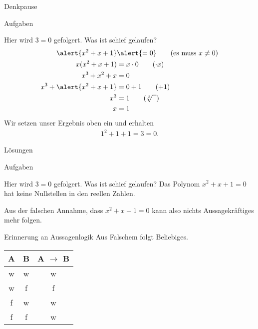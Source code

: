{
	\begin{frame}[fragile]{Denkpause}
		\begin{alertblock}{Aufgaben}
		\small{
			\begin{block}{Hier wird $3=0$ gefolgert. Was ist schief gelaufen?}
				\begin{align*}
					\alert{x^2 + x + 1} &\alert{= 0} \tag{es muss $x\neq0$}\\
					x(x^2 + x + 1) &= x \cdot 0 \tag{$\cdot x$}\\
					x^3 + x^2 + x &= 0\\
					x^3 + \alert{x^2 + x + 1} &= 0 + 1\tag{$+ 1$}\\
					x^3 &= 1\tag{$\sqrt[3]{\phantom{x}}$}\\
					x &= 1
				\end{align*}
				Wir setzen unser Ergebnis oben ein und erhalten
				\begin{align*}
					1^2 + 1 + 1= 3 = 0\text{.}
				\end{align*}
			\end{block}
		}
		\end{alertblock}
	\end{frame}
}

{
	\begin{frame}[fragile]{Lösungen}
		\begin{alertblock}{Aufgaben}
		\small{
			\begin{block}{Hier wird $3=0$ gefolgert. Was ist schief gelaufen?}
				Das Polynom $x^2 + x + 1 = 0$ hat keine Nullstellen in den reellen Zahlen.
				
				Aus der falschen Annahme, dass $x^2 + x + 1 = 0$ kann also nichts Aussagekräftiges mehr folgen.
			\end{block}
			\begin{alertblock}{Erinnerung an Aussagenlogik}
				Aus Falschem folgt Beliebiges.\\
				\begin{table}
					\begin{tabular}{ccc}
						\toprule
						A & B & A $\rightarrow$ B \\
						\midrule
						w & w & w \\
						w & f & f \\
						\alert{f} & \alert{w} & \alert{w} \\
						\alert{f} & \alert{f} & \alert{w} \\
						\bottomrule
					\end{tabular}
				\end{table}
			\end{alertblock}
		}
		\end{alertblock}
	\end{frame}
}